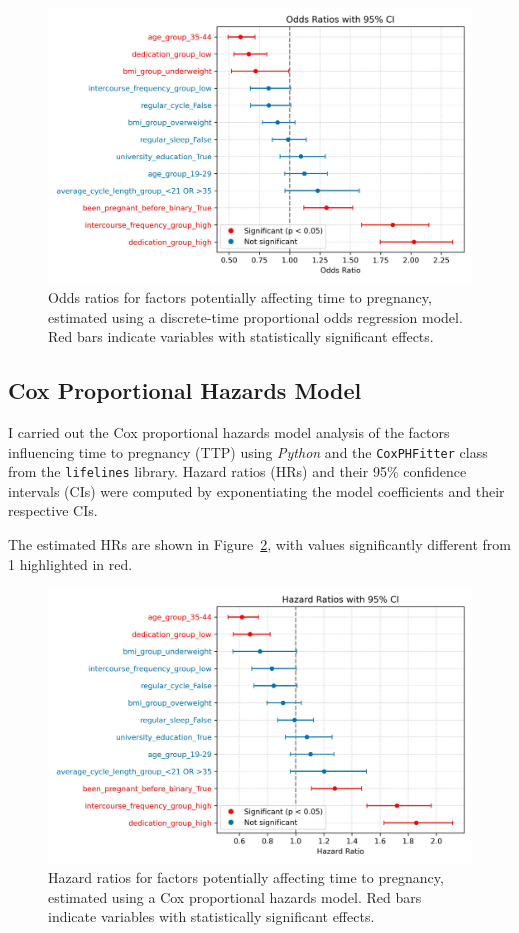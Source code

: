 \documentclass[11pt]{article}
\begin{document}
\begin{figure}
  \centering
  \includegraphics[width=0.65\linewidth]{plots/OR.jpg}
  \caption{
    Odds ratios for factors potentially affecting time to pregnancy, estimated using a discrete-time proportional odds regression model. Red bars indicate variables with statistically significant effects. \\
  } 
  \label{fig:or}
\end{figure}


\subsection{Cox Proportional Hazards Model}

I carried out the Cox proportional hazards model analysis of the factors influencing time to pregnancy (TTP) using \textit{Python} and the \texttt{CoxPHFitter} class from the \texttt{lifelines} library. Hazard ratios (HRs) and their 95\% confidence intervals (CIs) were computed by exponentiating the model coefficients and their respective CIs.

The estimated HRs are shown in Figure~\ref{fig:cox_hr}, with values significantly different from 1 highlighted in red.

\begin{figure}
  \centering
  \includegraphics[width=0.65\linewidth]{plots/cox_hr_plot.jpg}
  \caption{
    Hazard ratios for factors potentially affecting time to pregnancy, estimated using a Cox proportional hazards model. Red bars indicate variables with statistically significant effects.\\
  } 
  \label{fig:cox_hr}
\end{figure}
\end{document}
